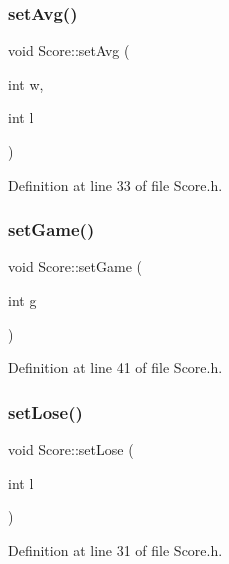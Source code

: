 \subsubsection{\texorpdfstring{set\+Avg()}{setAvg()}}
{\footnotesize\ttfamily void Score\+::set\+Avg (\begin{DoxyParamCaption}\item[{int}]{w,  }\item[{int}]{l }\end{DoxyParamCaption})\hspace{0.3cm}{\ttfamily [inline]}}



Definition at line 33 of file Score.\+h.

\hypertarget{class_score_a43f2e628a61dd5b802434e87cfd1ece5}{}\label{class_score_a43f2e628a61dd5b802434e87cfd1ece5} 
\subsubsection{\texorpdfstring{set\+Game()}{setGame()}}
{\footnotesize\ttfamily void Score\+::set\+Game (\begin{DoxyParamCaption}\item[{int}]{g }\end{DoxyParamCaption})\hspace{0.3cm}{\ttfamily [inline]}}



Definition at line 41 of file Score.\+h.

\hypertarget{class_score_a70591f02bd619c64b09d1925a6a62f16}{}\label{class_score_a70591f02bd619c64b09d1925a6a62f16} 
\subsubsection{\texorpdfstring{set\+Lose()}{setLose()}}
{\footnotesize\ttfamily void Score\+::set\+Lose (\begin{DoxyParamCaption}\item[{int}]{l }\end{DoxyParamCaption})\hspace{0.3cm}{\ttfamily [inline]}}



Definition at line 31 of file Score.\+h.

\hypertarget{class_score_a8d8e4762df39c231a828a26e759695e2}{}\label{class_score_a8d8e4762df39c231a828a26e759695e2} 
